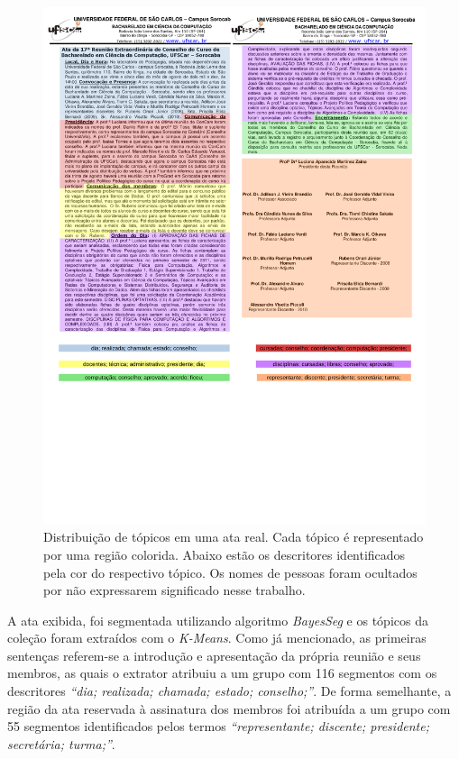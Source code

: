   \begin{center}
	\begin{figure}[h!]

		\includegraphics[trim={ 0 235 0 0 },clip,page=1,width=\textwidth]{conteudo/capitulos/figs/doc-em-png/distribuicao.pdf}

		\caption{Distribuição de tópicos em uma ata real. Cada tópico é representado por uma região colorida. Abaixo estão os descritores identificados pela cor do respectivo tópico. Os nomes de pessoas foram ocultados por não expressarem significado nesse trabalho.}
		\label{fig:distribuicao-ata}
	\end{figure}
\end{center}


A ata exibida, foi segmentada utilizando algoritmo \textit{BayesSeg} e os tópicos da coleção foram extraídos com o \textit{K-Means}. Como já mencionado, as primeiras sentenças referem-se a introdução e apresentação da própria reunião e seus membros, as quais o extrator atribuiu a um grupo com 116 segmentos com os descritores \textit{``dia; realizada; chamada; estado; conselho;''}. De forma semelhante, a região da ata reservada à assinatura dos membros foi atribuída a um grupo com 55 segmentos identificados pelos termos \textit{``representante; discente; presidente; secretária; turma;''}. 


